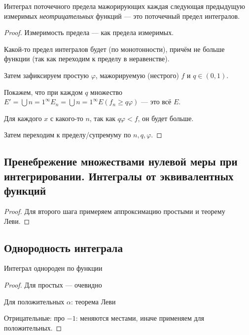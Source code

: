 \documentclass[12pt, a4paper, oneside]{memoir}
\begin{document}
\begin{theorem}
    Интеграл поточечного предела мажорирующих каждая следующая предыдущую 
    измеримых \textit{неотрицательных} функций — это поточечный предел интегралов.

    \begin{proof}
        Измеримость предела — как предела измеримых.

        Какой-то предел интегралов будет (по монотонности), причём не больше функции
        (так как переходим к пределу в неравенстве).

        Затем зафиксируем простую $\varphi$, мажорируемую (нестрого) $f$ и $q \in (0, 1)$.
        
        Покажем, что при каждом $q$ множество $E' = \bigcup{n = 1}^\infty E_n = \bigcup{n = 1}^\infty E(f_n \geqslant q \varphi)$ — это всё $E$.

        Для каждого $x$ с какого-то $n$, так как $q\varphi < f$, он будет больше.

        Затем переходим к пределу/супремуму по $n, q, \varphi$.
    \end{proof}
\end{theorem}


\subsection{Пренебрежение множествами нулевой меры при интегрировании.
Интегралы от эквивалентных функций}

\begin{lemma}

    \begin{proof}
        Для второго шага примеряем аппроксимацию простыми и теорему Леви.
    \end{proof}
\end{lemma}


\subsection{Однородность интеграла}

\begin{theorem}
    Интеграл однороден по функции

    \begin{proof}
        Для простых — очевидно

        Для положительных $\alpha$: теорема Леви

        Отрицательные: про $-1$: меняются местами, иначе применяем для положительных.
    \end{proof}
\end{theorem}
\end{document}
